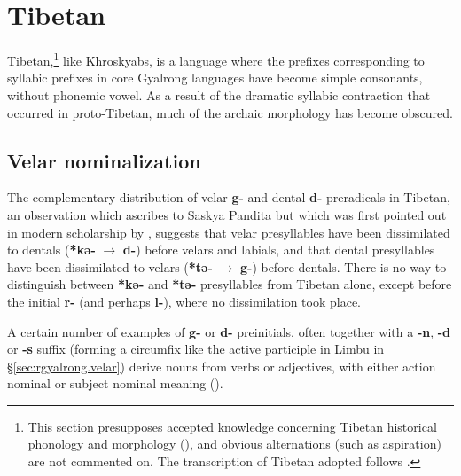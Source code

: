\documentclass[oneside,a4paper,11pt]{article}
\newcommand{\ipa}[1]{\textbf{{\phon\mbox{#1}}}} %
\begin{document}
\section{Tibetan}
Tibetan,\footnote{This section presupposes accepted knowledge concerning Tibetan historical phonology and morphology (\citealt{lifk33, coblin76, hill11laws, hill14derivational}), and obvious alternations (such as aspiration) are not commented on. The transcription of Tibetan adopted follows \citet{jacques12transcription}.} like Khroskyabs, is a language where the prefixes corresponding to syllabic prefixes in core Gyalrong languages have become simple consonants, without phonemic vowel. As a result of the dramatic syllabic contraction that occurred in proto-Tibetan, much of the archaic morphology has become obscured. 

\subsection{Velar nominalization} \label{sec:tibetan.velar}
The complementary distribution of velar \ipa{g-} and dental \ipa{d-} preradicals in Tibetan, an observation which \citet{hill11laws} ascribes to Saskya Pandita but which was first pointed out in modern scholarship by \citet{lifk33}, suggests that velar presyllables have been dissimilated to dentals (\ipa{*kə-} $\rightarrow$ \ipa{d-}) before velars and labials, and that dental presyllables have been dissimilated to velars (\ipa{*tə-} $\rightarrow$ \ipa{g-}) before dentals. There is no way to distinguish between \ipa{*kə-} and \ipa{*tə-} presyllables from Tibetan alone, except before the initial \ipa{r-} (and perhaps \ipa{l-}), where no dissimilation took place.

A certain number of examples of \ipa{g-} or \ipa{d-} preinitials, often together with a \ipa{-n}, \ipa{-d} or \ipa{-s} suffix (forming a circumfix like the active participle in Limbu in §\ref{sec:rgyalrong.velar}) derive nouns from verbs or adjectives, with either action nominal or subject nominal meaning (\citealt{jacques14snom}). 
\end{document}

